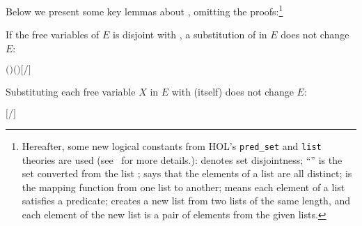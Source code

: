 Below we present some key lemmas about
, omitting the proofs:\footnote{Hereafter,
  some new logical constants from HOL's \texttt{pred_set}
and \texttt{list} theories are used (see~\cite{holdesc} for more
details.):  denotes set disjointness;
``'' is the set converted from the list ;
 says that
the elements of a list are all distinct;  is
the mapping function from one list to another;  means
each element of a list satisfies a predicate;  creates a
new list from two lists of the same length, and each element of the new list is a pair of
elements from the given lists.}

\begin{lemma}
If the free variables of $E$ is disjoint with , a
substitution of  in $E$ does not change $E$:
\begin{alltt}
\HOLTokenTurnstile{}  \ensuremath{(} \ensuremath{)} \ensuremath{(} \ensuremath{)} \HOLSymConst{\HOLTokenConj{}}   \HOLSymConst{\ensuremath{=}}   \HOLSymConst{\HOLTokenImp{}} \ensuremath{[}\ensuremath{/}\ensuremath{]}  \HOLSymConst{\ensuremath{=}} 
\end{alltt}
\end{lemma}

\begin{lemma}
  Substituting each free variable $X$ %
  in $E$ with  (itself) does not change $E$:
\begin{alltt}
\HOLTokenTurnstile{}   \HOLSymConst{\HOLTokenImp{}} \ensuremath{[}  \ensuremath{/}\ensuremath{]}  \HOLSymConst{\ensuremath{=}} 
\end{alltt}
\end{lemma}

